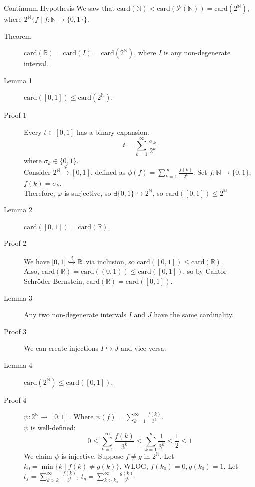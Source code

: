 \documentclass[10pt]{extarticle}
\newcommand{\card}{\text{card}}
\newcommand{\N}{\mathbb{N}}
\newcommand{\R}{\mathbb{R}}
\begin{document}
  \begin{problem}{Continuum Hypothesis}
    We saw that $\card(\N) < \card(\mathcal{P}(\N)) = \card(2^{\N})$, where $2^\N\{f\mid f:\N\rightarrow\{0,1\}\}$.
    \begin{description}
      \item[Theorem] $\card(\R) = \card(I)=\card(2^{\N})$, where $I$ is any non-degenerate interval.
    \end{description}
    \tcblower
    \begin{description}
      \item[Lemma 1] $\card([0,1]) \leq \card(2^{\N})$.
      \item[Proof 1] Every $t\in [0,1]$ has a binary expansion.
        \[
          t = \sum_{k = 1}^{\infty} \frac{\sigma_k}{2^k}
        \] 
        where $\sigma_k \in \{0,1\}$. \\

        Consider $2^{\N} \xrightarrow{\varphi} [0,1]$, defined as $\displaystyle \phi(f) = \sum_{k=1}^{\infty}\frac{f(k)}{2^k}$. Set $f: \N \rightarrow \{0,1\}$, $f(k) = \sigma_k$.\\

          Therefore, $\varphi$ is surjective, so $\exists \{0,1\}\hookrightarrow 2^{\N}$, so $\card([0,1]) \leq 2^{\N}$
        \item[Lemma 2] $\card([0,1]) = \card(\R)$.
        \item[Proof 2] We have $[0,1]\xhookrightarrow{i} \R$ via inclusion, so $\card([0,1])\leq \card(\R)$.\\

          Also, $\card(\R) = \card((0,1)) \leq \card([0,1])$, so by Cantor-Schröder-Bernstein, $\card(\R) = \card([0,1])$.
        \item[Lemma 3] Any two non-degenerate intervals $I$ and $J$ have the same cardinality. 
        \item[Proof 3] We can create injections $I\hookrightarrow J$ and vice-versa.
        \item[Lemma 4] $\card(2^{\N}) \leq \card([0,1])$.
        \item[Proof 4] $\psi: 2^{\N} \rightarrow [0,1]$. Where $\psi(f) = \sum_{k = 1}^{\infty}\frac{f(k)}{3^k}$.\\

          $\psi$ is well-defined:
          \[
            0\leq \sum_{k=1}^{\infty}\frac{f(k)}{3^k} \leq \sum_{k=1}^{\infty}\frac{1}{3^k} \leq \frac{1}{2} \leq 1
          \] 
          We claim $\psi$ is injective. Suppose $f\neq g$ in $2^{\N}$. Let $k_0 = \min\{k\mid f(k) \neq g(k)\}$. WLOG, $f(k_0) = 0, g(k_0) = 1$. Let $t_f = \sum_{k>k_0}^{\infty}\frac{f(k)}{3^k}$, $t_g = \sum_{k>k_0}^{\infty}\frac{g(k)}{3^k}$.\\


\end{description}
\end{problem}
\end{document}
